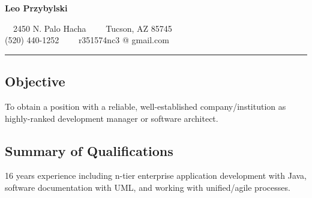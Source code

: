 \documentclass[10pt,letterpaper]{article}
\begin{document}
\begin{center}
  {\LARGE \textbf{Leo Przybylski}}

  \ \ 2450 N. Palo Hacha\ \ \textbullet
  \ \ Tucson, AZ 85745
  \\
  (520) 440-1252\ \ \textbullet
  \ \ r351574nc3 @ gmail.com
\end{center}

\hrule
\vspace{-0.4em}
\subsection*{Objective}
To obtain a position with a reliable, well-established
company/institution as highly-ranked development manager or software
architect.

\subsection*{Summary of Qualifications}
16 years experience including n-tier enterprise application development with Java, software 
documentation with UML, and working with unified/agile processes. 
\end{document}
